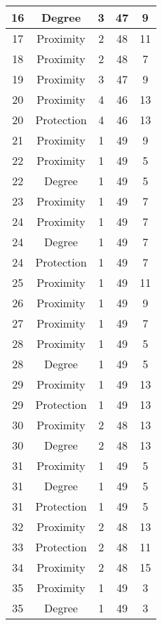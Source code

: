 \documentclass[results.tex]{subfiles}
\begin{document}
\begin{center}
\begin{tabular}{| c || c | c | c | c |}
    \hline
    16 & Degree & 3 & 47 & 9 \\ 
    \hline
    17 & Proximity & 2 & 48 & 11 \\ 
    \hline
    18 & Proximity & 2 & 48 & 7 \\ 
    \hline
    19 & Proximity & 3 & 47 & 9 \\ 
    \hline
    20 & Proximity & 4 & 46 & 13 \\ 
    \hline
    20 & Protection & 4 & 46 & 13 \\ 
    \hline
    21 & Proximity & 1 & 49 & 9 \\ 
    \hline
    22 & Proximity & 1 & 49 & 5 \\ 
    \hline
    22 & Degree & 1 & 49 & 5 \\ 
    \hline
    23 & Proximity & 1 & 49 & 7 \\ 
    \hline
    24 & Proximity & 1 & 49 & 7 \\ 
    \hline
    24 & Degree & 1 & 49 & 7 \\ 
    \hline
    24 & Protection & 1 & 49 & 7 \\ 
    \hline
    25 & Proximity & 1 & 49 & 11 \\ 
    \hline
    26 & Proximity & 1 & 49 & 9 \\ 
    \hline
    27 & Proximity & 1 & 49 & 7 \\ 
    \hline
    28 & Proximity & 1 & 49 & 5 \\ 
    \hline
    28 & Degree & 1 & 49 & 5 \\ 
    \hline
    29 & Proximity & 1 & 49 & 13 \\ 
    \hline
    29 & Protection & 1 & 49 & 13 \\ 
    \hline
    30 & Proximity & 2 & 48 & 13 \\ 
    \hline
    30 & Degree & 2 & 48 & 13 \\ 
    \hline
    31 & Proximity & 1 & 49 & 5 \\ 
    \hline
    31 & Degree & 1 & 49 & 5 \\ 
    \hline
    31 & Protection & 1 & 49 & 5 \\ 
    \hline
    32 & Proximity & 2 & 48 & 13 \\ 
    \hline
    33 & Protection & 2 & 48 & 11 \\ 
    \hline
    34 & Proximity & 2 & 48 & 15 \\ 
    \hline
    35 & Proximity & 1 & 49 & 3 \\ 
    \hline
    35 & Degree & 1 & 49 & 3 \\ 

\end{tabular}
\end{center}
\end{document}
